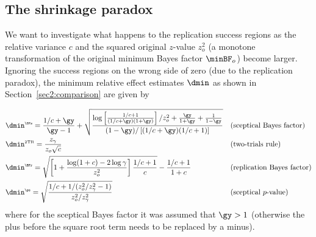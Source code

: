 \begin{subappendices}
\section{The shrinkage paradox}
\label{app:shrinkage}
We want to investigate what happens to the replication success regions as the
relative variance $c$ and the squared original $z$-value $z_{o}^{2}$ (a monotone
transformation of the original minimum Bayes factor $\minBF_{o}$) become larger.
Ignoring the success regions on the wrong side of zero (due to the replication
paradox), the minimum relative effect estimates $\dmin$ as shown in
Section~\ref{sec2:comparison} are given by

\begin{align*}
    &\dmin^{\scriptscriptstyle \BFs} =
      \frac{1/c + \gy}{\gy - 1} +
      \sqrt{\frac{\log\left[\frac{1/c + 1}{(1/c + \gy)(1 + \gy)}\right]/z_{o}^{2}
      + \frac{\gy}{1 + \gy} + \frac{1}{1 - \gy}}{(1 - \gy)/\left[(1/c + \gy)(1/c + 1)\right]}}&
  &\text{(sceptical Bayes factor)} \\
    &\dmin^{\scriptscriptstyle \text{2TR}} =
      \frac{z_{\gamma}}{z_{o}\sqrt{c}}&
  &\text{(two-trials rule)} \\
    &\dmin^{\scriptscriptstyle \BFr} =
      \sqrt{\left[1 + \frac{\log(1 + c) - 2\log \gamma}{z_{o}^{2}}\right] \frac{1/c + 1}{c}} - \frac{1/c + 1}{1 + c} &
  &\text{(replication Bayes factor)} \\
    &\dmin^{\scriptscriptstyle \ps} =
      \sqrt{\frac{1/c + 1/(z_{o}^{2}/z_{\gamma}^{2} - 1)}{z_{o}^{2}/z_{\gamma}^{2}}}&
  &\text{(sceptical $p$-value)} \\
\end{align*}
where for the sceptical Bayes factor it was assumed that $\gy > 1$ (otherwise
the plus before the square root term needs to be replaced by a minus).


\end{subappendices}
